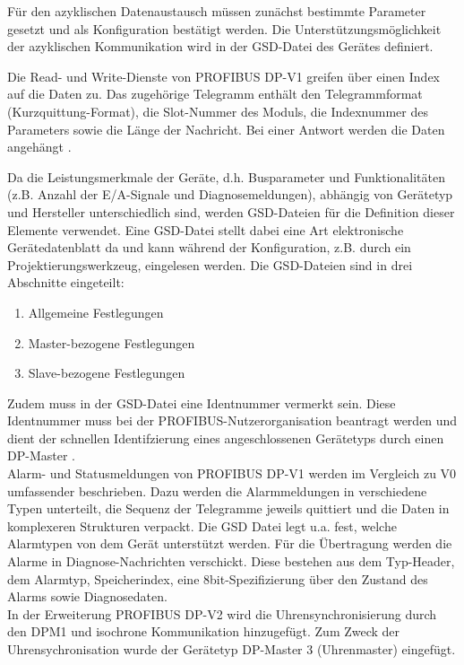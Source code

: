 Für den azyklischen Datenaustausch müssen zunächst bestimmte Parameter gesetzt und als Konfiguration bestätigt werden. Die Unterstützungsmöglichkeit der azyklischen Kommunikation wird in der GSD-Datei des Gerätes definiert. 

Die Read- und Write-Dienste von PROFIBUS DP-V1 greifen über einen Index auf die Daten zu. Das zugehörige Telegramm enthält den Telegrammformat (\glqq Kurzquittung\grqq -Format), die Slot-Nummer des Moduls, die Indexnummer des Parameters sowie die Länge der Nachricht. Bei einer Antwort werden die Daten angehängt \citep{Profibus11}.


Da die Leistungsmerkmale der Geräte, d.h. Busparameter und Funktionalitäten (z.B. Anzahl der E/A-Signale und Diagnosemeldungen), abhängig von Gerätetyp und Hersteller unterschiedlich sind, werden GSD-Dateien für die Definition dieser Elemente verwendet. Eine GSD-Datei stellt dabei eine Art elektronische Gerätedatenblatt da und kann während der Konfiguration, z.B. durch ein Projektierungswerkzeug, eingelesen werden. Die GSD-Dateien sind in drei Abschnitte eingeteilt:
\begin{enumerate}
\item Allgemeine Festlegungen
\item Master-bezogene Festlegungen
\item Slave-bezogene Festlegungen
\end{enumerate}

Zudem muss in der GSD-Datei eine Identnummer vermerkt sein. Diese Identnummer muss bei der PROFIBUS-Nutzerorganisation beantragt werden und dient der schnellen Identifzierung eines angeschlossenen Gerätetyps durch einen DP-Master \citep{Profibus6}.\\

Alarm- und Statusmeldungen von PROFIBUS DP-V1 werden im Vergleich zu V0 umfassender beschrieben. Dazu werden die Alarmmeldungen in verschiedene Typen unterteilt, die Sequenz der Telegramme jeweils quittiert und die Daten in komplexeren Strukturen verpackt. Die GSD Datei legt u.a. fest, welche Alarmtypen von dem Gerät unterstützt werden. Für die Übertragung werden die Alarme in Diagnose-Nachrichten verschickt. Diese bestehen aus dem Typ-Header, dem Alarmtyp, Speicherindex, eine 8bit-Spezifizierung über den Zustand des Alarms sowie Diagnosedaten.\\

In der Erweiterung PROFIBUS DP-V2 wird die Uhrensynchronisierung durch den DPM1 und isochrone Kommunikation hinzugefügt. Zum Zweck der Uhrensychronisation wurde der Gerätetyp DP-Master 3 (Uhrenmaster) eingefügt.

